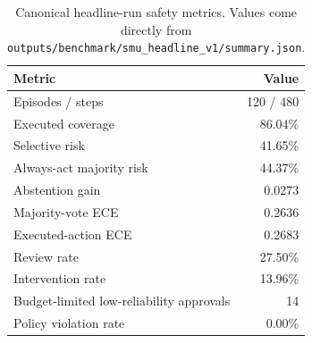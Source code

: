 
\begin{table}[H]
\centering
\caption{Canonical headline-run safety metrics. Values come directly from \texttt{outputs/benchmark/smu\_headline\_v1/summary.json}.}
\label{tab:headline-metrics}
\begin{tabular}{lr}
\toprule
Metric & Value \\
\midrule
Episodes / steps & 120 / 480 \\
Executed coverage & 86.04\% \\
Selective risk & 41.65\% \\
Always-act majority risk & 44.37\% \\
Abstention gain & 0.0273 \\
Majority-vote ECE & 0.2636 \\
Executed-action ECE & 0.2683 \\
Review rate & 27.50\% \\
Intervention rate & 13.96\% \\
Budget-limited low-reliability approvals & 14 \\
Policy violation rate & 0.00\% \\
\bottomrule
\end{tabular}
\end{table}
